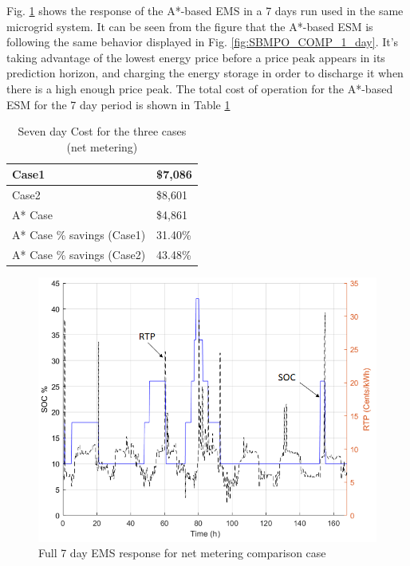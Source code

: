 Fig. \ref{fig:SBMPO_COMP_10_12} shows the response of the A*-based EMS in a  7 days run used in the same microgrid system.  It can be seen from the figure that the A*-based ESM is following the same behavior displayed in Fig. \ref{fig:SBMPO_COMP_1_day}. It's taking advantage of the lowest energy price before a price peak appears in its prediction horizon, and charging the energy storage in order to discharge it when there is a high enough price peak. The total cost of operation for the A*-based ESM for the 7 day period is shown in Table \ref{tab:Cost1}

\begin{table}[htb]
\caption{Seven day Cost for the three cases (net metering)}
\centering
\label{tab:Cost1}
\begin{tabular}{|l|l|}
\hline
Case1 & \$7,086 \\ \hline
Case2 & \$8,601 \\ \hline
A* Case & \$4,861 \\ \hline
A* Case \% savings (Case1) & 31.40\% \\ \hline
A* Case \% savings (Case2) & 43.48\% \\ \hline

\end{tabular}
\end{table}

\begin{figure}[!ht]
    \centering
    \includegraphics[width = \linewidth]{figs/A8/SBMPO_COMP_10_12.png}
    \caption{Full 7 day EMS response for net metering comparison case}
    \label{fig:SBMPO_COMP_10_12}
\end{figure}

